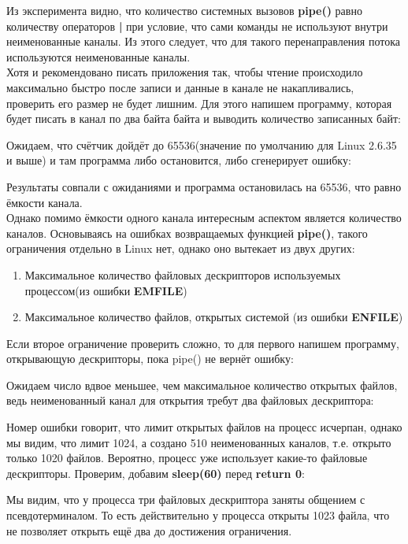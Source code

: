 \documentclass[a4paper]{article}
\begin{document}
	
	
	Из эксперимента видно, что количество системных вызовов \textbf{pipe()} равно количеству операторов \textbf{|} при условие, что сами команды не используют внутри неименованные каналы. Из этого следует, что для такого перенаправления потока используются неименованные каналы.\\
	
	Хотя и рекомендовано писать приложения так, чтобы чтение происходило максимально быстро после записи и данные в канале не накапливались, проверить его размер не будет лишним. Для этого напишем программу, которая будет писать в канал по два байта байта и выводить количество записанных байт:
	
	
	
	Ожидаем, что счётчик дойдёт до 65536(значение по умолчанию для Linux 2.6.35 и выше) и там программа либо остановится, либо сгенерирует ошибку:
	
	Результаты совпали с ожиданиями и программа остановилась на 65536, что равно ёмкости канала.\\
	
	Однако помимо ёмкости одного канала интересным аспектом является количество каналов. Основываясь на ошибках возвращаемых функцией \textbf{pipe()}, такого ограничения отдельно в Linux нет, однако оно вытекает из двух других:
\begin{enumerate}
	\item Максимальное количество файловых дескрипторов используемых процессом(из ошибки \textbf{EMFILE})
	\item Максимальное количество файлов, открытых системой (из ошибки \textbf{ENFILE})
\end{enumerate}
	Если второе ограничение проверить сложно, то для первого напишем программу, открывающую дескрипторы, пока pipe() не вернёт ошибку:
	
	
	Ожидаем число вдвое меньшее, чем максимальное количество открытых файлов, ведь неименованный канал для открытия требут два файловых дескриптора:
	
	Номер ошибки говорит, что лимит открытых файлов на процесс исчерпан, однако мы видим, что лимит 1024, а создано 510 неименованных каналов, т.е. открыто только 1020 файлов. Вероятно, процесс уже использует какие-то файловые дескрипторы. Проверим, добавим \textbf{sleep(60)} перед \textbf{return 0}:
	
	Мы видим, что у процесса три файловых дескриптора заняты общением с псевдотерминалом. То есть действительно у процесса открыты 1023 файла, что не позволяет открыть ещё два до достижения ограничения.
	
\end{document}
